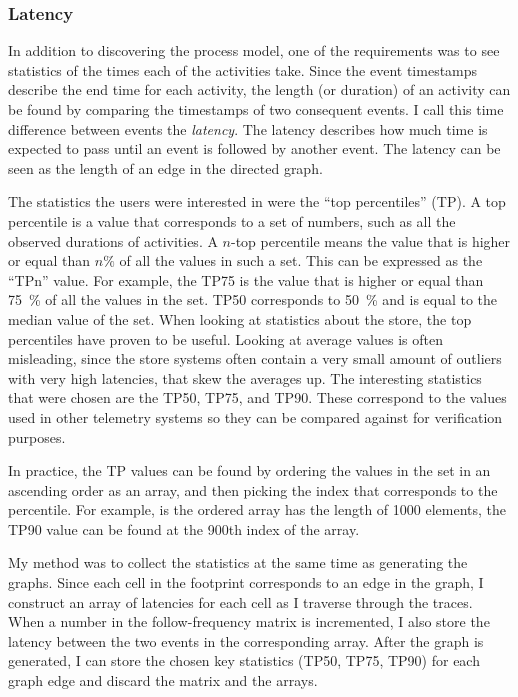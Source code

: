 \subsubsection{Latency}
\label{sec:latency}

In addition to discovering the process model, one of the requirements was to see statistics of the times each of the activities take. 
Since the event timestamps describe the end time for each activity, the length (or duration) of an activity can be found by comparing the timestamps of two consequent events. 
I call this time difference between events the \emph{latency}.
The latency describes how much time is expected to pass until an event is followed by another event.
The latency can be seen as the length of an edge in the directed graph.

The statistics the users were interested in were the ``top percentiles'' (TP).
A top percentile is a value that corresponds to a set of numbers, such as all the observed durations of activities.
A $n$-top percentile means the value that is higher or equal than $n\%$ of all the values in such a set.
This can be expressed as the ``TPn'' value.
For example, the TP75 is the value that is higher or equal than 75~\% of all the values in the set.
TP50 corresponds to 50~\% and is equal to the median value of the set.
When looking at statistics about the store, the top percentiles have proven to be useful.
Looking at average values is often misleading, since the store systems often contain a very small amount of outliers with very high latencies, that skew the averages up.
The interesting statistics that were chosen are the TP50, TP75, and TP90. 
These correspond to the values used in other telemetry systems so they can be compared against for verification purposes.

In practice, the TP values can be found by ordering the values in the set in an ascending order as an array, and then picking the index that corresponds to the percentile. For example, is the ordered array has the length of 1000 elements, the TP90 value can be found at the 900th index of the array.

My method was to collect the statistics at the same time as generating the graphs.
Since each cell in the footprint corresponds to an edge in the graph, I construct an array of latencies for each cell as I traverse through the traces.
When a number in the follow-frequency matrix is incremented, I also store the latency between the two events in the corresponding array. 
After the graph is generated, I can store the chosen key statistics (TP50, TP75, TP90) for each graph edge and discard the matrix and the arrays.

